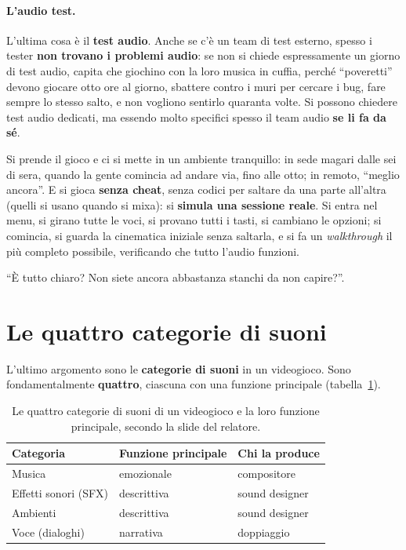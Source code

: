 \paragraph{L'audio test.} L'ultima cosa è il \textbf{test audio}. Anche se c'è un
team di test esterno, spesso i tester \textbf{non trovano i problemi audio}: se
non si chiede espressamente un giorno di test audio, capita che giochino con la
loro musica in cuffia, perché ``poveretti'' devono giocare otto ore al giorno,
sbattere contro i muri per cercare i bug, fare sempre lo stesso salto, e non
vogliono sentirlo quaranta volte. Si possono chiedere test audio dedicati, ma
essendo molto specifici spesso il team audio \textbf{se li fa da sé}.

Si prende il gioco e ci si mette in un ambiente tranquillo: in sede magari dalle
sei di sera, quando la gente comincia ad andare via, fino alle otto; in remoto,
``meglio ancora''. E si gioca \textbf{senza cheat}, senza codici per saltare da
una parte all'altra (quelli si usano quando si mixa): si \textbf{simula una
sessione reale}. Si entra nel menu, si girano tutte le voci, si provano tutti i
tasti, si cambiano le opzioni; si comincia, si guarda la cinematica iniziale
senza saltarla, e si fa un \emph{walkthrough} il più completo possibile,
verificando che tutto l'audio funzioni.

``È tutto chiaro? Non siete ancora abbastanza stanchi da non capire?''.

\section{Le quattro categorie di suoni}
\label{z9:sec:categorie}

L'ultimo argomento sono le \textbf{categorie di suoni} in un videogioco. Sono
fondamentalmente \textbf{quattro}, ciascuna con una funzione principale
(tabella~\ref{z9:tab:categorie}).

\begin{table}[htbp]
\centering
\begin{tabular}{@{}lll@{}}
\toprule
\textbf{Categoria} & \textbf{Funzione principale} & \textbf{Chi la produce} \\
\midrule
Musica           & emozionale    & compositore \\
Effetti sonori (SFX) & descrittiva & sound designer \\
Ambienti         & descrittiva   & sound designer \\
Voce (dialoghi)  & narrativa     & doppiaggio \\
\bottomrule
\end{tabular}
\caption{Le quattro categorie di suoni di un videogioco e la loro funzione
principale, secondo la slide del relatore.}
\label{z9:tab:categorie}
\end{table}

